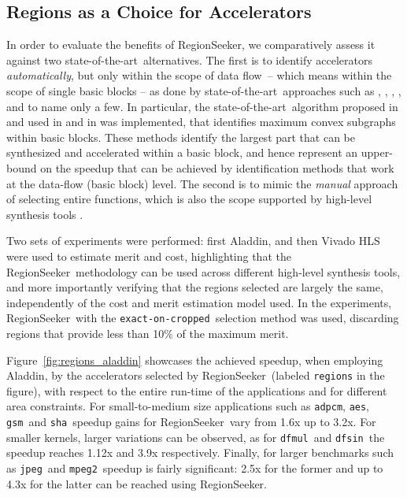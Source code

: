 \documentclass[]{usiinfthesis}
\newcommand{\rseeker}{{RegionSeeker}}
\newcommand{\SoTA}{{state-of-the-art}}
\newcommand{\dataflow}{data flow}
\newcommand{\exactC}{\texttt{exact-on-cropped}}
\newcommand{\adpcm}{\texttt{adpcm}}
\newcommand{\sha}{\texttt{sha}}
\newcommand{\jpeg}{\texttt{jpeg}}
\newcommand{\mpeg}{\texttt{mpeg2}}
\newcommand{\aes}{\texttt{aes}}
\newcommand{\dfmul}{\texttt{dfmul}}
\newcommand{\dfsin}{\texttt{dfsin}}
\newcommand{\gsm}{\texttt{gsm}}
\begin{document}
\subsection{Regions as a Choice for Accelerators}
\label{subsec:res_llvm}

In order to evaluate the benefits of \rseeker, we comparatively assess
it against two \SoTA\ alternatives.  The first is to
identify accelerators \emph{automatically}, but only within the scope
of \dataflow\ -- which means within the scope of single basic blocks
-- as done by \SoTA\ approaches such as \cite{ChenFeb07}, \cite{GiaquintaMar15}, 
\cite{PozziJul06}, \cite{ReddingtonAug09}, and
 \cite{YuSep04} to name only a few. In particular, the \SoTA\ algorithm 
proposed in \cite{VermaOct07} and used in \cite{GiaquintaMar15} and in
 \cite{PothineniJan07}  was implemented, that identifies maximum convex subgraphs within
basic blocks. These methods identify the largest part that can be
synthesized and accelerated within a basic block, and hence represent
an upper-bound on the speedup that can be achieved by identification
methods that work at the data-flow (basic block) level. The second is
to mimic the \emph{manual} approach of selecting entire functions,
which is also the scope supported by high-level synthesis tools
\cite{CanisSep13} \cite{VillarrealMay10} \cite{VivadoHLSMar17}.\par

Two sets of experiments were performed: first Aladdin, and then
Vivado HLS were used to estimate merit and cost, highlighting that
the \rseeker\ methodology can be used
across different high-level synthesis tools, and more importantly
verifying that the regions selected are largely the same,
independently of the cost and merit estimation model used.
In the experiments, \rseeker\ with the \exactC\ selection method was
used, discarding regions that provide less than 10\% of the maximum
merit.\par

Figure~\ref{fig:regions_aladdin} showcases the achieved
speedup, when employing Aladdin, by the accelerators selected by
\rseeker\ (labeled \texttt{regions} in the figure), with respect to
the entire run-time of the applications and for different area
constraints.  For small-to-medium size applications such as \adpcm,
\aes, \gsm\ and \sha\ speedup gains for \rseeker\ vary from 1.6x up to
3.2x. For smaller kernels, larger variations can be observed, as for
\dfmul\ and \dfsin\ the speedup reaches 1.12x and 3.9x respectively.
Finally, for larger benchmarks such as \jpeg\ and \mpeg\, speedup is
fairly significant: 2.5x for the former and up to 4.3x for the latter
can be reached using \rseeker.\par
\end{document}
